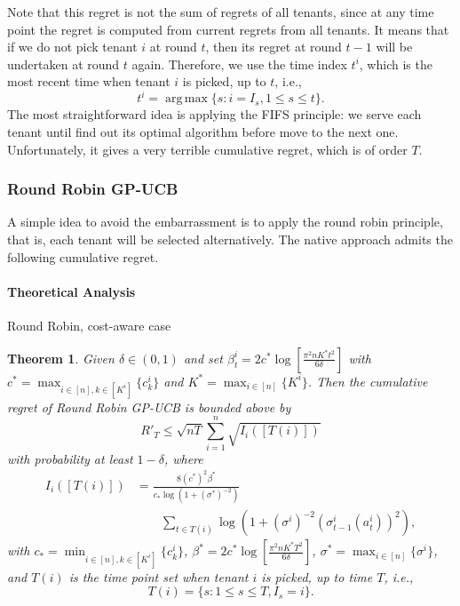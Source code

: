 \documentclass[letterpaper]{vldb}
\newtheorem{theorem}{Theorem}
\DeclareMathOperator*{\argmax}{arg\,max}
\begin{document}
Note that this regret is not the sum of regrets of all tenants, since at any time point the regret is computed {\color{red}from current regrets from all tenants}. It means that if we do not pick tenant $i$ at round $t$, then its regret at round $t-1$ will be undertaken at round $t$ again. Therefore, we use the time index $t^i$, which is the most recent time when tenant $i$ is picked, up to $t$, i.e.,
\[
t^i = \argmax\{s: i=I_s, 1\le s\le t\}.
\]
The most straightforward idea is applying the FIFS principle: we serve each tenant until find out its optimal algorithm before move to the next one. Unfortunately, it gives a very terrible cumulative regret, which is of order $T$.

\subsubsection{Round Robin GP-UCB}
A simple idea to avoid the embarrassment is to apply the round robin principle, that is, each tenant will be selected alternatively. The native approach admits the following cumulative regret.


\paragraph*{Theoretical Analysis}

{\color{red} Round Robin, cost-aware case}

\begin{theorem}
  \label{thm:rr}
  Given $\delta\in (0,1)$ and set $\beta_t^i = 2c^\ast \log\left[\frac{\pi^2 n K^\ast t^2}{6\delta}\right]$ with $c^\ast = \max_{i\in [n], k\in [K^i]}\{c^i_k\}$ and $K^\ast = \max_{i\in [n]}\{K^i\}$. Then the
  cumulative regret of Round Robin GP-UCB is bounded above by
  \[
     R'_T \leq \sqrt{n T}\sum_{i=1}^n \sqrt{I_i([T(i)])}
  \]
  with probability at least $1-\delta$,
  where
  \begin{align*}
    I_i([T(i)]) & = \frac{8 (c^\ast)^2 \beta^\ast}{c_\ast \log(1 + (\sigma^\ast)^{-2})}\\
    &\qquad \sum_{t\in T(i)} \log\left(1 + (\sigma^i)^{-2}(\sigma^i_{t-1}(a^i_{t}))^2\right),
  \end{align*}
  with $c_\ast = \min_{i\in [n], k\in [K^i]}\{c^i_k\}$,  $\beta^\ast = 2c^\ast \log\left[\frac{\pi^2 n K^\ast T^2}{6\delta}\right]$, $\sigma^\ast= \max_{i\in [n]}\{\sigma^i\}$, and $T(i)$ is the time point set when tenant $i$ is picked, up to time $T$, i.e.,
  \begin{equation}
    \label{eq:T(i)}
    T(i) = \{s: 1\le s\le T, I_s = i\}.
  \end{equation}
\end{theorem}
\end{document}
